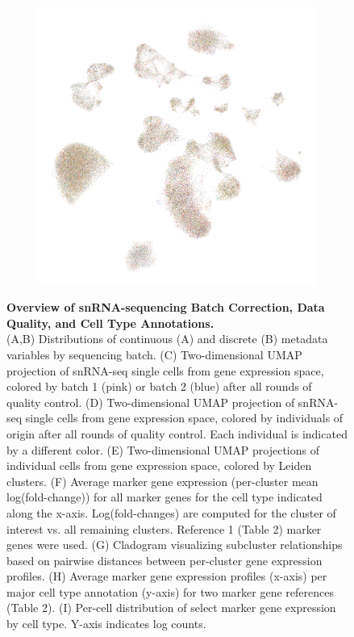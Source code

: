 \begin{figure}[ht]
\begin{subfigure}[t]{.3\textwidth}
        \includegraphics[width=\textwidth]{./extended_plots/projid_projection.png}        
    \end{subfigure}     
    \caption{
        \textbf{Overview of snRNA-sequencing Batch Correction, Data Quality, and Cell Type Annotations.}\\[1ex]
        (A,B) Distributions of continuous (A) and discrete (B) metadata variables by sequencing batch. 
        (C) Two-dimensional UMAP projection of snRNA-seq single cells from gene expression space, colored by batch 1 (pink) or batch 2 (blue) after all rounds of quality control. 
        (D) Two-dimensional UMAP projection of snRNA-seq single cells from gene expression space, colored by individuals of origin after all rounds of quality control. Each individual is indicated by a different color. 
        (E) Two-dimensional UMAP projections of individual cells from gene expression space, colored by Leiden clusters. 
        (F) Average marker gene expression (per-cluster mean log(fold-change)) for all marker genes for the cell type indicated along the x-axis. Log(fold-changes) are computed for the cluster of interest vs. all remaining clusters. Reference 1 (Table 2) marker genes were used. 
        (G) Cladogram visualizing subcluster relationships based on pairwise distances between per-cluster gene expression profiles. 
        (H) Average marker gene expression profiles (x-axis) per major cell type annotation (y-axis) for two marker gene references (Table 2). (I) Per-cell distribution of select marker gene expression by cell type. Y-axis indicates log counts. 
}
\end{figure}

